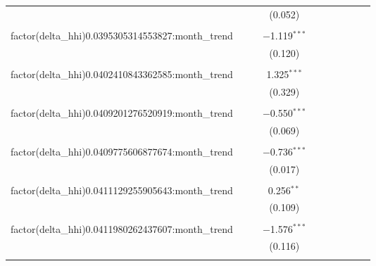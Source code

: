 \begin{table}[H]
{\begin{tabular}{@{\extracolsep{5pt}}lccccccccc}
   &  &  & (0.052) &  &  &  &  &  &  \\  

   & & & & & & & & & \\  

  factor(delta\_hhi)0.0395305314553827:month\_trend &  &  & $-$1.119$^{***}$ &  &  &  &  &  &  \\  

   &  &  & (0.120) &  &  &  &  &  &  \\  

   & & & & & & & & & \\  

  factor(delta\_hhi)0.0402410843362585:month\_trend &  &  & 1.325$^{***}$ &  &  &  &  &  &  \\  

   &  &  & (0.329) &  &  &  &  &  &  \\  

   & & & & & & & & & \\  

  factor(delta\_hhi)0.0409201276520919:month\_trend &  &  & $-$0.550$^{***}$ &  &  &  &  &  &  \\  

   &  &  & (0.069) &  &  &  &  &  &  \\  

   & & & & & & & & & \\  

  factor(delta\_hhi)0.0409775606877674:month\_trend &  &  & $-$0.736$^{***}$ &  &  &  &  &  &  \\  

   &  &  & (0.017) &  &  &  &  &  &  \\  

   & & & & & & & & & \\  

  factor(delta\_hhi)0.0411129255905643:month\_trend &  &  & 0.256$^{**}$ &  &  &  &  &  &  \\  

   &  &  & (0.109) &  &  &  &  &  &  \\  

   & & & & & & & & & \\  

  factor(delta\_hhi)0.0411980262437607:month\_trend &  &  & $-$1.576$^{***}$ &  &  &  &  &  &  \\  

   &  &  & (0.116) &  &  &  &  &  &  \\  

   & & & & & & & & & \\  


\end{tabular}}
\end{table}
